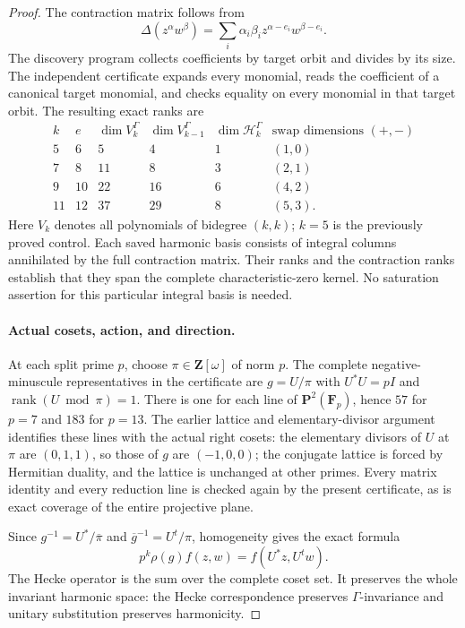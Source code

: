 \documentclass[11pt,a4paper]{article}
\theoremstyle{definition}
\begin{document}
\begin{proof}
The contraction matrix follows from
\[
 \Delta(z^\alpha w^\beta)
 =\sum_i\alpha_i\beta_i z^{\alpha-e_i}w^{\beta-e_i}.
\]
The discovery program collects coefficients by target orbit and
divides by its size. The independent certificate expands every
monomial, reads the coefficient of a canonical target monomial,
and checks equality on every monomial in that target orbit.
The resulting exact ranks are
\[
\begin{array}{c|c|r|r|r|c}
k&e&\dim V_k^\Gamma&\dim V_{k-1}^\Gamma&
 \dim\mathcal H_k^\Gamma&\text{swap dimensions }(+,-)\\ \hline
5&6&5&4&1&(1,0)\\
7&8&11&8&3&(2,1)\\
9&10&22&16&6&(4,2)\\
11&12&37&29&8&(5,3).
\end{array}
\tag{UG.6}
\]
Here $V_k$ denotes all polynomials of bidegree $(k,k)$; $k=5$ is the
previously proved control. Each saved harmonic basis consists of
integral columns annihilated by the full contraction matrix.
Their ranks and the contraction ranks establish that they span
the complete characteristic-zero kernel. No saturation assertion
for this particular integral basis is needed.

\paragraph{Actual cosets, action, and direction.}
At each split prime $p$, choose $\pi\in\mathbf Z[\omega]$ of norm $p$.
The complete negative-minuscule representatives in the certificate
are $g=U/\pi$ with
$U^*U=pI$ and $\operatorname{rank}(U\bmod\pi)=1$.
There is one for each line of $\mathbf P^2(\mathbf F_p)$, hence
$57$ for $p=7$ and $183$ for $p=13$.
The earlier lattice and elementary-divisor argument identifies
these lines with the actual right cosets: the elementary divisors
of $U$ at $\pi$ are $(0,1,1)$, so those of $g$ are $(-1,0,0)$;
the conjugate lattice is forced by Hermitian duality, and the
lattice is unchanged at other primes. Every matrix identity and
every reduction line is checked again by the present certificate,
as is exact coverage of the entire projective plane.

Since $g^{-1}=U^*/\overline\pi$ and
$\overline g^{-1}=U^t/\pi$, homogeneity gives the exact formula
\[
 p^k\rho(g)f(z,w)=f(U^*z,U^tw).
 \tag{UG.7}
\]
The Hecke operator is the sum over the complete coset set. It
preserves the whole invariant harmonic space: the Hecke
correspondence preserves $\Gamma$-invariance and unitary
substitution preserves harmonicity.


\end{proof}
\end{document}
